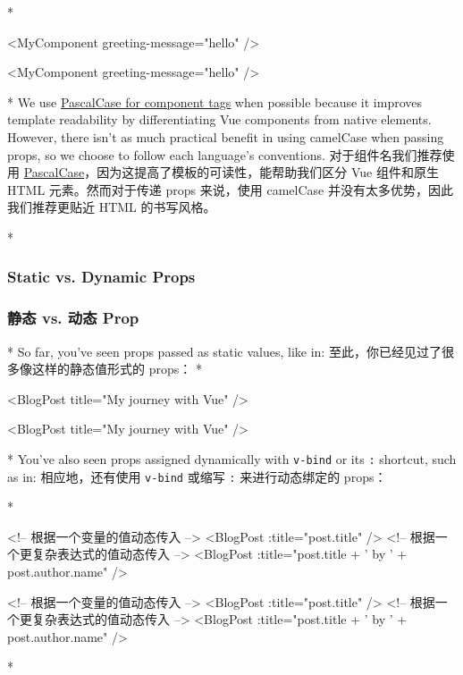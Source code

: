 \begin{paracol}{2}
\switchcolumn[0]*%
\begin{codeHtml}
<MyComponent greeting-message="hello" />
\end{codeHtml}
\switchcolumn
\begin{codeHtml}
<MyComponent greeting-message="hello" />
\end{codeHtml}
\switchcolumn[0]*%
We use
\href{https://vuejs.org/guide/components/registration.html\#component-name-casing}{PascalCase
for component tags} when possible because it improves template
readability by differentiating Vue components from native elements.
However, there isn't as much practical benefit in using camelCase when
passing props, so we choose to follow each language's conventions.
\switchcolumn
对于组件名我们推荐使用
\href{https://cn.vuejs.org/guide/components/registration.html\#component-name-casing}{PascalCase}，因为这提高了模板的可读性，能帮助我们区分
Vue 组件和原生 HTML 元素。然而对于传递 props 来说，使用 camelCase
并没有太多优势，因此我们推荐更贴近 HTML 的书写风格。

\switchcolumn[0]*%
\subsubsection{Static vs. Dynamic Props}
\switchcolumn
\subsubsection{静态 vs. 动态 Prop}
\switchcolumn[0]*%
So far, you've seen props passed as static values, like in:
\switchcolumn
至此，你已经见过了很多像这样的静态值形式的 props：
\switchcolumn[0]*%
\begin{codeHtml}
<BlogPost title="My journey with Vue" />
\end{codeHtml}
\switchcolumn
\begin{codeHtml}
<BlogPost title="My journey with Vue" />
\end{codeHtml}
\switchcolumn[0]*%
You've also seen props assigned dynamically with \texttt{v-bind} or its
\texttt{:} shortcut, such as in:
\switchcolumn
相应地，还有使用 \texttt{v-bind} 或缩写 \texttt{:} 来进行动态绑定的
props：

\switchcolumn[0]*%
\begin{codeHtml}
<!-- 根据一个变量的值动态传入 -->
<BlogPost :title="post.title" />
<!-- 根据一个更复杂表达式的值动态传入 -->
<BlogPost :title="post.title + ' by ' + post.author.name" />
\end{codeHtml}
\switchcolumn
\begin{codeHtml}
<!-- 根据一个变量的值动态传入 -->
<BlogPost :title="post.title" />
<!-- 根据一个更复杂表达式的值动态传入 -->
<BlogPost :title="post.title + ' by ' + post.author.name" />
\end{codeHtml}
\switchcolumn[0]*%

\end{paracol}
